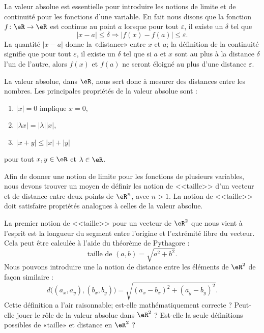 
La valeur absolue est essentielle pour introduire les notions de limite et de continuité pour les fonctions d'une variable. En fait nous disons que la fonction $f\colon \eR\to \eR$ est continue au point $a$ lorsque pour tout $\varepsilon$, il existe un $\delta$ tel que
\begin{equation}
	| x-a |\leq\delta \Rightarrow | f(x)-f(a) |\leq \varepsilon.
\end{equation}
La quantité $| x-a |$ donne la «distance» entre $x$ et $a$; la définition de la continuité signifie que pour tout $\varepsilon$, il existe un $\delta$ tel que si $a$ et $x$ sont au plus à la distance $\delta$ l'un de l'autre, alors $f(x)$ et $f(a)$ ne seront éloigné au plus d'une distance $\varepsilon$.

La valeur absolue, dans $\eR$, nous sert donc à mesurer des distances entre les nombres. Les principales propriétés de la valeur absolue sont :
\begin{enumerate}

	\item
		$| x |=0$ implique $x=0$,
	\item
		$| \lambda x |=| \lambda | |x |$,
	\item
		$| x+y |\leq | x |+| y |$

\end{enumerate}
pour tout $x,y\in\eR$ et $\lambda\in\eR$.

Afin de donner une notion de limite pour les fonctions de plusieurs variables, nous devons trouver un moyen de définir les notion de <<taille>> d'un vecteur et de distance entre deux points de $\eR^n$, avec $n>1$. La notion de <<taille>> doit satisfaire propriétés analogues à celles de la valeur absolue. 

La premier notion de <<taille>> pour un vecteur de $\eR^2$ que nous vient à l'esprit est la longueur du segment entre l'origine et l'extrémité libre du vecteur. Cela peut être calculée à l'aide du théorème de Pythagore : 
\begin{equation}
  \textrm{taille de } (a,b) = \sqrt{a^2+b^2}.
\end{equation}
Nous pouvons introduire une la notion de distance entre les éléments de $\eR^2$ de façon similaire :
\begin{equation}
	d\big((a_x,a_y),(b_x,b_y)\big)=\sqrt{  (a_x-b_x)^2+(a_y-b_y)^2  }.
\end{equation}
Cette définition a l'air raisonnable; est-elle mathématiquement correcte ? Peut-elle jouer le rôle de la valeur absolue dans $\eR^2$ ? Est-elle la seule définitions possibles de «taille» et distance en $\eR^2$ ?  

